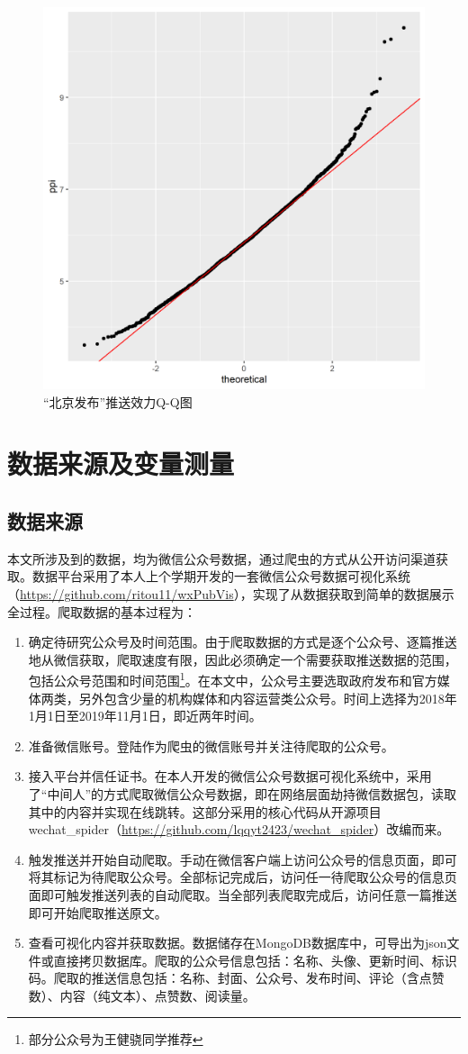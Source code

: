\documentclass[a4paper,12pt,UTF8]{article}
\begin{document}
    \begin{figure}[htbp]
      \centering
      \includegraphics[width=0.6\linewidth]{北京发布-qq.png}
      \caption{“北京发布”推送效力Q-Q图}
      \label{fig:beijing-qq}
    \end{figure}

    \section{数据来源及变量测量}
    \subsection{数据来源}
    本文所涉及到的数据，均为微信公众号数据，通过爬虫的方式从公开访问渠道获取。数据平台采用了本人上个学期开发的一套微信公众号数据可视化系统（\url{https://github.com/ritou11/wxPubVis}），实现了从数据获取到简单的数据展示全过程。爬取数据的基本过程为：
    \begin{enumerate}
      \item 确定待研究公众号及时间范围。由于爬取数据的方式是逐个公众号、逐篇推送地从微信获取，爬取速度有限，因此必须确定一个需要获取推送数据的范围，包括公众号范围和时间范围\thanks{部分公众号为王健骁同学推荐}。在本文中，公众号主要选取政府发布和官方媒体两类，另外包含少量的机构媒体和内容运营类公众号。时间上选择为2018年1月1日至2019年11月1日，即近两年时间。
      \item 准备微信账号。登陆作为爬虫的微信账号并关注待爬取的公众号。
      \item 接入平台并信任证书。在本人开发的微信公众号数据可视化系统中，采用了“中间人”的方式爬取微信公众号数据，即在网络层面劫持微信数据包，读取其中的内容并实现在线跳转。这部分采用的核心代码从开源项目wechat\_spider（\url{https://github.com/lqqyt2423/wechat_spider}）改编而来。
      \item 触发推送并开始自动爬取。手动在微信客户端上访问公众号的信息页面，即可将其标记为待爬取公众号。全部标记完成后，访问任一待爬取公众号的信息页面即可触发推送列表的自动爬取。当全部列表爬取完成后，访问任意一篇推送即可开始爬取推送原文。
      \item 查看可视化内容并获取数据。数据储存在MongoDB数据库中，可导出为json文件或直接拷贝数据库。爬取的公众号信息包括：名称、头像、更新时间、标识码。爬取的推送信息包括：名称、封面、公众号、发布时间、评论（含点赞数）、内容（纯文本）、点赞数、阅读量。
    \end{enumerate}
\end{document}
